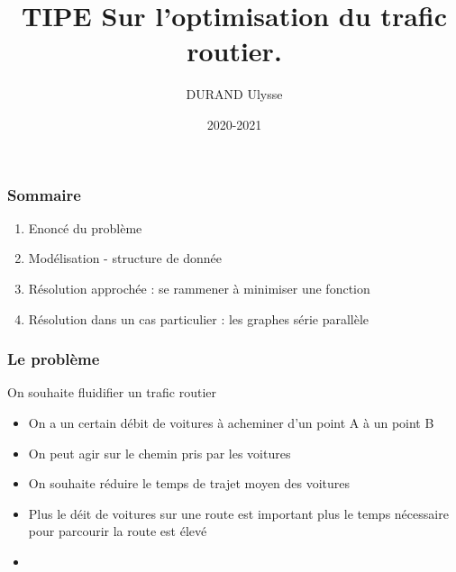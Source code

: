 \documentclass{beamer}
\title{TIPE Sur l'optimisation du trafic routier.}
\author{DURAND Ulysse}
\date{2020-2021}
\institute{MPX-Lycée Blaise Pascal}
\begin{document}
\maketitle


\begin{frame}
\frametitle{Sommaire}
\begin{enumerate}
    \item Enoncé du problème
    \item Modélisation - structure de donnée
    \item Résolution approchée : se rammener à minimiser une fonction
    \item Résolution dans un cas particulier : les graphes série parallèle
\end{enumerate}
\end{frame}

\begin{frame}
\frametitle{Le problème}
On souhaite fluidifier un trafic routier
\begin{itemize}
\item On a un certain débit de voitures à acheminer d'un point A à un point B
\item On peut agir sur le chemin pris par les voitures
\item On souhaite réduire le temps de trajet moyen des voitures
\item Plus le déit de voitures sur une route est important plus le temps
nécessaire pour parcourir la route est élevé
\item 
\end{itemize}
\end{frame}
\end{document}
